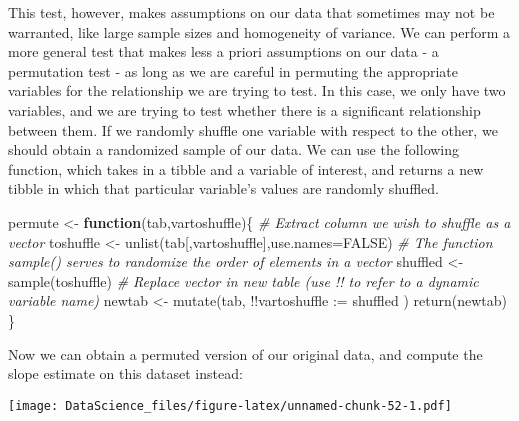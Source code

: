 \documentclass[
]{book}
\newenvironment{Shaded}{\begin{snugshade}}{\end{snugshade}}
\newcommand{\AttributeTok}[1]{\textcolor[rgb]{0.77,0.63,0.00}{#1}}
\newcommand{\CommentTok}[1]{\textcolor[rgb]{0.56,0.35,0.01}{\textit{#1}}}
\newcommand{\ConstantTok}[1]{\textcolor[rgb]{0.00,0.00,0.00}{#1}}
\newcommand{\ControlFlowTok}[1]{\textcolor[rgb]{0.13,0.29,0.53}{\textbf{#1}}}
\newcommand{\FunctionTok}[1]{\textcolor[rgb]{0.00,0.00,0.00}{#1}}
\newcommand{\NormalTok}[1]{#1}
\newcommand{\OtherTok}[1]{\textcolor[rgb]{0.56,0.35,0.01}{#1}}
\newcommand{\SpecialCharTok}[1]{\textcolor[rgb]{0.00,0.00,0.00}{#1}}
\newcommand{\StringTok}[1]{\textcolor[rgb]{0.31,0.60,0.02}{#1}}
\begin{document}
This test, however, makes assumptions on our data that sometimes may not be warranted, like large sample sizes and homogeneity of variance. We can perform a more general test that makes less a priori assumptions on our data - a permutation test - as long as we are careful in permuting the appropriate variables for the relationship we are trying to test. In this case, we only have two variables, and we are trying to test whether there is a significant relationship between them. If we randomly shuffle one variable with respect to the other, we should obtain a randomized sample of our data. We can use the following function, which takes in a tibble and a variable of interest, and returns a new tibble in which that particular variable's values are randomly shuffled.

\begin{Shaded}
\begin{Highlighting}[]
\NormalTok{permute }\OtherTok{\textless{}{-}} \ControlFlowTok{function}\NormalTok{(tab,vartoshuffle)\{}
  \CommentTok{\# Extract column we wish to shuffle as a vector}
\NormalTok{  toshuffle }\OtherTok{\textless{}{-}} \FunctionTok{unlist}\NormalTok{(tab[,vartoshuffle],}\AttributeTok{use.names=}\ConstantTok{FALSE}\NormalTok{)}
  \CommentTok{\# The function sample() serves to randomize the order of elements in a vector}
\NormalTok{  shuffled }\OtherTok{\textless{}{-}} \FunctionTok{sample}\NormalTok{(toshuffle)}
  \CommentTok{\# Replace vector in new table (use !! to refer to a dynamic variable name)}
\NormalTok{  newtab }\OtherTok{\textless{}{-}} \FunctionTok{mutate}\NormalTok{(tab, }\SpecialCharTok{!!}\AttributeTok{vartoshuffle :=}\NormalTok{ shuffled )}
  \FunctionTok{return}\NormalTok{(newtab)}
\NormalTok{\}}
\end{Highlighting}
\end{Shaded}

Now we can obtain a permuted version of our original data, and compute the slope estimate on this dataset instead:

\begin{Shaded}
\end{Shaded}

\texttt{[image: DataScience\_files/figure-latex/unnamed-chunk-52-1.pdf]}
\end{document}
